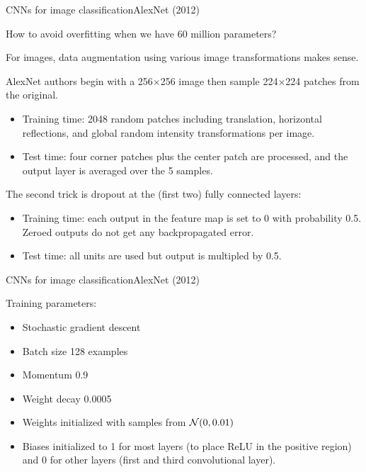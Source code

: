 \documentclass[aspectratio=169]{beamer}
\begin{document}
\begin{frame}{CNNs for image classification}{AlexNet (2012)}

  How to avoid overfitting when we have 60 million parameters?

  \medskip

  For images, \alert{data augmentation} using various image
  transformations makes sense.

  \medskip

  AlexNet authors begin with a 256$\times$256 image then sample
  224$\times$224 patches from the original.
  \begin{itemize}
  \item Training time: 2048 random patches including translation,
    horizontal reflections, and global random intensity
    transformations per image.
  \item Test time: four corner patches plus the center patch are
    processed, and the output layer is averaged over the 5 samples.
  \end{itemize}

  \medskip

  The second trick is \alert{dropout} at the (first two) fully
  connected layers:
  \begin{itemize}
  \item Training time: each output in the feature map is set to 0 with
    probability 0.5. Zeroed outputs do not get any backpropagated
    error.
  \item Test time: all units are used but output is multipled by 0.5.
  \end{itemize}
  
\end{frame}


\begin{frame}{CNNs for image classification}{AlexNet (2012)}

  Training parameters:
  \begin{itemize}
  \item Stochastic gradient descent
  \item Batch size 128 examples
  \item Momentum 0.9
  \item Weight decay 0.0005
  \item Weights initialized with samples from ${\cal N}(0,0.01)$
  \item Biases initialized to 1 for most layers (to place ReLU in the
    positive region) and 0 for other layers (first and third
    convolutional layer).
  \end{itemize}

  \end{frame}
\end{document}
